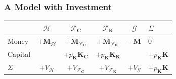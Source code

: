 \documentclass[]{beamer}
\begin{document}
\begin{frame}
	\frametitle{A Model with Investment}
	\begin{table}
		\centering
		\begin{tabular}{l|cccc|l}
			& $\mathcal{H}$             & $\mathcal{F}_\mathbf{C}$               & $\mathcal{F}_\mathbf{K}$               & $\mathcal{G}$    & $\Sigma$                   \\
			\midrule
			Money    & $+\mathbf{M}_\mathcal{H}$ & $+\mathbf{M}_{\mathcal{F}_\mathbf{C}}$ & $+\mathbf{M}_{\mathcal{F}_\mathbf{K}}$ & $-\mathbf{M}$    & 0                          \\
			\midrule
			Capital  &                           & $+p_\mathbf{K} \mathbf{K}_\mathbf{C}$  & $+p_\mathbf{K} \mathbf{K}_\mathbf{K}$  &                  & $+p_\mathbf{K} \mathbf{K}$ \\
			\midrule
			$\Sigma$ & $+V_\mathcal{H}$          & $+V_{\mathcal{F}_\mathbf{C}}$          & $+V_{\mathcal{F}_\mathbf{K}}$          & $+V_\mathcal{G}$ & $+p_\mathbf{K} \mathbf{K}$ \\
		\end{tabular}
	\end{table}
	
	\begin{table}
		\centering
		\begin{tabular}{l|cccc|l}
			

\end{tabular}
\end{table}
\end{frame}
\end{document}
